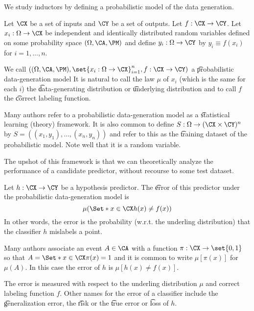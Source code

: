 

We study inductors by defining a probabilistic model of the data generation.


Let $\CX$ be a set of inputs and $\CY$ be a set of outputs.
Let $f: \CX \to \CY$.
Let $x_i: \Omega \to \CX$ be independent and identically distributed random variables defined on some probability space $(\Omega, \CA, \PM)$ and define $y_i: \Omega \to \CY$ by $y_i \equiv f(x_i)$ for $i = 1, \dots, n$.

We call $((\Omega, \CA, \PM), \set{x_i: \Omega \to \CX}_{i=1}^{n}, f: \CX \to \CY)$ a \t{probabilistic data-generation model}
It is natural to call the law $\mu$ of $x_i$ (which is the same for each $i$) the \t{data-generating distribution} or \t{underlying distribution} and to call $f$ the \t{correct labeling function}.

Many authors refer to a probabilistic data-generation model as a \t{statistical learning (theory) framework}.
It is also common to define $S: \Omega \to (\CX \times \CY)^n$ by $S = ((x_1, y_1), \dots, (x_n, y_n))$ and refer to this as the \t{training dataset} of the probabilistic model.
Note well that it is a random variable.


The upshot of this framework is that we can theoretically analyze the performance of a candidate predictor, without recourse to some test dataset.

Let $h: \CX \to \CY$ be a hypothesis predictor.
The \t{error} of this predictor under the probabilistic data-generation model is
\[
  \mu(\Set*{x \in \CX}{h(x) \neq f(x)})
\]
In other words, the error is the probability (w.r.t. the underling distribution) that the classifier $h$ mislabels a point.

Many authors associate an event $A \in \CA$ with a function $\pi: \CX \to \set{0, 1}$ so that $A = \Set*{x \in \CX}{\pi(x) = 1}$ and it is common to write $\mu[\pi(x)]$ for $\mu(A)$.
In this case the error of $h$ is $\mu[h(x) \neq f(x)]$.

The error is measured with respect to the underling distribution $\mu$ and correct labeling function $f$.
Other names for the error of a classifier include the \t{generalization error}, the \t{risk} or the \t{true error} or \t{loss} of $h$.
